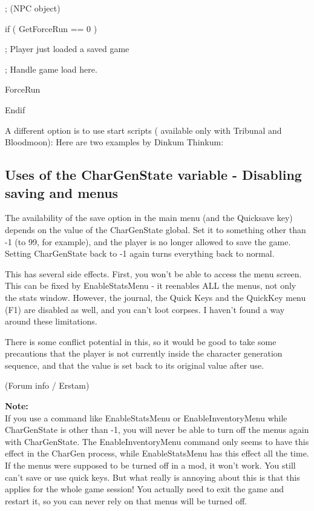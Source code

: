 ; (NPC object)

if ( GetForceRun == 0 )

; Player just loaded a saved game

; Handle game load here.

ForceRun

Endif

A different option is to use start scripts ( available only with
Tribunal and Bloodmoon): Here are two examples by Dinkum Thinkum:





\hypertarget{uses-of-the-chargenstate-variable---disabling-saving-and-menus}{%
\subsection{Uses of the CharGenState variable - Disabling saving and
menus}\label{uses-of-the-chargenstate-variable---disabling-saving-and-menus}}

The availability of the save option in the main menu (and the Quicksave
key) depends on the value of the CharGenState global. Set it to
something other than -1 (to 99, for example), and the player is no
longer allowed to save the game. Setting CharGenState back to -1 again
turns everything back to normal.

This has several side effects. First, you won't be able to access the
menu screen. This can be fixed by EnableStatsMenu - it reenables ALL the
menus, not only the stats window. However, the journal, the Quick Keys
and the QuickKey menu (F1) are disabled as well, and you can't loot
corpses. I haven't found a way around these limitations.

There is some conflict potential in this, so it would be good to take
some precautions that the player is not currently inside the character
generation sequence, and that the value is set back to its original
value after use.

(Forum info / Erstam)

\textbf{Note:\\
}If you use a command like EnableStatsMenu or EnableInventoryMenu while
CharGenState is other than -1, you will never be able to turn off the
menus again with CharGenState. The EnableInventoryMenu command only
seems to have this effect in the CharGen process, while EnableStatsMenu
has this effect all the time. If the menus were supposed to be turned
off in a mod, it won't work. You still can't save or use quick keys. But
what really is annoying about this is that this applies for the whole
game session! You actually need to exit the game and restart it, so you
can never rely on that menus will be turned off.

